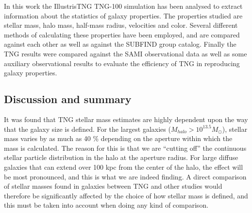 
In this work the IllustrisTNG TNG-100 simulation has been analysed to extract information about the statistics of galaxy properties. The properties studied are stellar mass, halo mass, half-mass radius, velocities and color. Several different methods of calculating these properties have been employed, and are compared against each other as well as against the SUBFIND group catalog. Finally the TNG results were compared against the SAMI observational data as well as some auxiliary observational results to evaluate the efficiency of TNG in reproducing galaxy properties.

\subsection{Discussion and summary}
It was found that TNG stellar mass estimates are highly dependent upon the way that the galaxy size is defined. For the largest galaxies ($M_{halo} > 10^{13.5} M_\odot$), stellar mass varies by as much as 40 \% depending on the aperture within which the mass is calculated. The reason for this is that we are ``cutting off'' the continuous stellar particle distribution in the halo at the aperture radius. For large diffuse galaxies that can extend over 100 kpc from the center of the halo, the effect will be most pronounced, and this is what we are indeed finding. A direct comparison of stellar masses found in galaxies between TNG and other studies would therefore be significantly affected by the choice of how stellar mass is defined, and this must be taken into account when doing any kind of comparison. 


